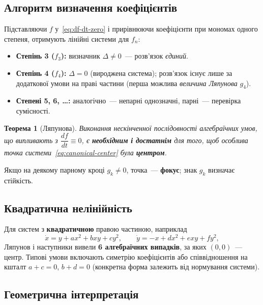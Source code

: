 \documentclass[12pt,a4paper]{article}
\theoremstyle{definition}
\theoremstyle{plain}
\newtheorem*{teorema*}{Теорема}
\begin{document}
\subsection{Алгоритм визначення коефіцієнтів}

Підставляючи $f$ у~\eqref{eq:df-dt-zero} і прирівнюючи коефіцієнти при
мономах одного степеня, отримують лінійні системи для $f_n$:

\begin{itemize}[leftmargin=1.4em]
  \item \textbf{Степінь 3 ($f_3$):} визначник $\Delta\neq0$~--- розв'язок
        \emph{єдиний}.
  \item \textbf{Степінь 4 ($f_4$):} $\Delta=0$ (вироджена система); розв'язок
        існує лише за додаткової умови на праві частини (перша можлива
        \emph{величина Ляпунова} $g_4$).
  \item \textbf{Степені 5, 6, \ldots:} аналогічно~--- непарні однозначні,
        парні~--- перевірка сумісності.
\end{itemize}

\begin{teorema*}[Ляпунова]
Виконання нескінченної послідовності алгебраїчних умов, що випливають з
$\dfrac{df}{dt}\equiv0$, є \textbf{необхідним і достатнім} для того, щоб
особлива точка системи~\eqref{eq:canonical-center} була \textbf{центром}.
\end{teorema*}

Якщо на деякому парному кроці $g_k\neq0$, точка~--- \textbf{фокус}; знак
$g_k$ визначає стійкість.

\subsection{Квадратична нелінійність}

Для систем з \textbf{квадратичною} правою частиною, наприклад
\begin{equation}
  \dot x = y + ax^2 + bxy + cy^2, \qquad
  \dot y = -x + dx^2 + exy + fy^2,
\end{equation}
Ляпунов і наступники вивели \textbf{6 алгебраїчних випадків}, за яких
$(0,0)$~--- центр. Типові умови включають симетрію коефіцієнтів або
співвідношення на кшталт $a+c=0$, $b+d=0$ (конкретна форма залежить від
нормування системи).

\subsection{Геометрична інтерпретація}
\end{document}
